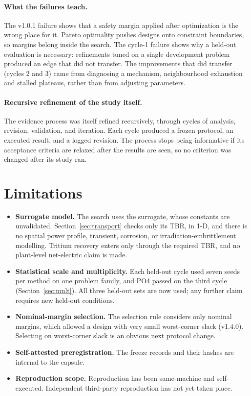\documentclass[11pt]{article}
\begin{document}
\paragraph{What the failures teach.}
The v1.0.1 failure shows that a safety margin applied after optimization is the wrong place for it.
Pareto optimality pushes designs onto constraint boundaries, so margins belong inside the search.
The cycle-1 failure shows why a held-out evaluation is necessary: refinements tuned on a single
development problem produced an edge that did not transfer. The improvements that did transfer
(cycles 2 and 3) came from diagnosing a mechanism, neighbourhood exhaustion and stalled plateaus,
rather than from adjusting parameters.

\paragraph{Recursive refinement of the study itself.}
The evidence process was itself refined recursively, through cycles of
analysis, revision, validation, and iteration. Each cycle produced a frozen protocol, an executed
result, and a logged revision. The process stops being informative if its acceptance criteria are
relaxed after the results are seen, so no criterion was changed after its study ran.

\section{Limitations}

\begin{itemize}[leftmargin=1.2em]
  \item \textbf{Surrogate model.} The search uses the surrogate, whose constants are unvalidated.
  Section~\ref{sec:transport} checks only its TBR, in 1-D, and there is no spatial power profile, transient,
  corrosion, or irradiation-embrittlement modelling. Tritium
  recovery enters only through the required TBR, and no plant-level net-electric claim is made.
  \item \textbf{Statistical scale and multiplicity.} Each held-out cycle used seven seeds per method on one problem
  family, and PO4 passed on the third cycle (Section~\ref{sec:mult}). All three held-out sets are now
  used; any further claim requires new held-out conditions.
  \item \textbf{Nominal-margin selection.} The selection rule considers only nominal margins, which allowed a
  design with very small worst-corner slack (v1.4.0). Selecting on worst-corner slack is an obvious next protocol change.
  \item \textbf{Self-attested preregistration.} The freeze records and their hashes are internal to the capsule.
  \item \textbf{Reproduction scope.} Reproduction has been same-machine and self-executed. Independent third-party
  reproduction has not yet taken place.
\end{itemize}
\end{document}
